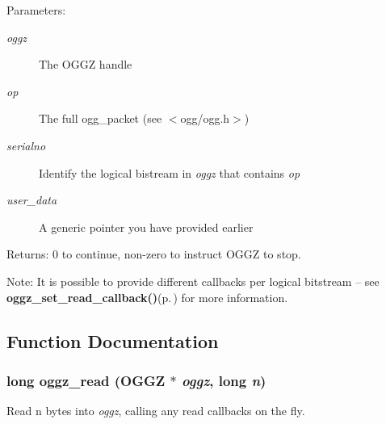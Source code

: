 \begin{Desc}
\item[Parameters:]
\begin{description}
\item[{\em oggz}]The OGGZ handle \item[{\em op}]The full ogg\_\-packet (see $<$ogg/ogg.h$>$) \item[{\em serialno}]Identify the logical bistream in {\em oggz\/} that contains {\em op\/} \item[{\em user\_\-data}]A generic pointer you have provided earlier \end{description}
\end{Desc}
\begin{Desc}
\item[Returns:]0 to continue, non-zero to instruct OGGZ to stop.\end{Desc}
\begin{Desc}
\item[Note:]It is possible to provide different callbacks per logical bitstream -- see {\bf oggz\_\-set\_\-read\_\-callback()}{\rm (p.\,\pageref{group__read__api_ga1})} for more information. \end{Desc}


\subsection{Function Documentation}
\subsubsection{\setlength{\rightskip}{0pt plus 5cm}long oggz\_\-read ({\bf OGGZ} $\ast$ {\em oggz}, long {\em n})}\label{group__read__api_ga2}


Read n bytes into {\em oggz\/}, calling any read callbacks on the fly. 

